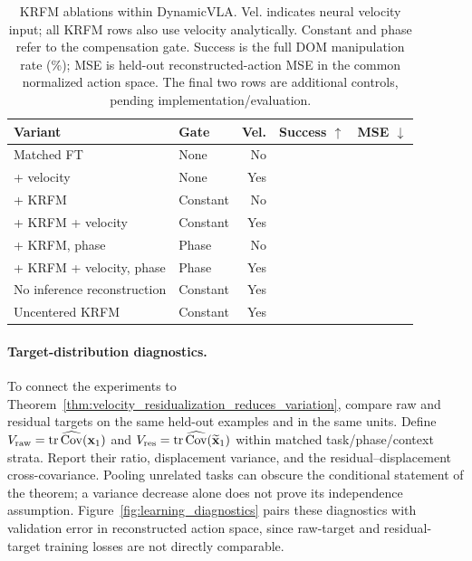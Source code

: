 \documentclass[10pt,twocolumn,letterpaper]{article}
\newcommand{\pending}{\phantom{00.00}}
\begin{document}
\begin{table}[t]
\centering
\caption{KRFM ablations within DynamicVLA. Vel. indicates neural velocity input;
all KRFM rows also use velocity analytically. Constant and phase refer to the
compensation gate. Success is the full DOM manipulation rate (\%); MSE is
held-out reconstructed-action MSE in the common normalized action space.
The final two rows are additional controls, pending implementation/evaluation.}
\label{tab:krfm_ablation}
\setlength{\tabcolsep}{3pt}
\scriptsize
\begin{tabular*}{\linewidth}{@{\extracolsep{\fill}}llrrr@{}}
\toprule
Variant & Gate & Vel. & Success $\uparrow$ & MSE $\downarrow$ \\
\midrule
Matched FT & None & No & \pending & \pending \\
+ velocity & None & Yes & \pending & \pending \\
+ KRFM & Constant & No & \pending & \pending \\
+ KRFM + velocity & Constant & Yes & \pending & \pending \\
+ KRFM, phase & Phase & No & \pending & \pending \\
+ KRFM + velocity, phase & Phase & Yes & \pending & \pending \\
\midrule
No inference reconstruction & Constant & Yes & \pending & \pending \\
Uncentered KRFM & Constant & Yes & \pending & \pending \\
\bottomrule
\end{tabular*}
\end{table}

\paragraph{Target-distribution diagnostics.}
To connect the experiments to
Theorem~\ref{thm:velocity_residualization_reduces_variation}, compare raw and
residual targets on the same held-out examples and in the same units. Define
$V_{\rm raw}=\operatorname{tr}\widehat{\operatorname{Cov}}(\mathbf x_1)$ and
$V_{\rm res}=\operatorname{tr}\widehat{\operatorname{Cov}}(\widetilde{\mathbf x}_1)$
within matched task/phase/context strata. Report their ratio, displacement
variance, and the residual--displacement cross-covariance. Pooling unrelated
tasks can obscure the conditional statement of the theorem; a variance decrease
alone does not prove its independence assumption. Figure~\ref{fig:learning_diagnostics}
pairs these diagnostics with validation error in reconstructed action space,
since raw-target and residual-target training losses are not directly comparable.
\end{document}
